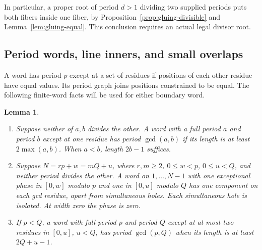 \documentclass[11pt,a4paper]{amsart}
\numberwithin{equation}{section}
\theoremstyle{plain}
\newtheorem{lemma}[theorem]{Lemma}
\theoremstyle{definition}
\begin{document}
In particular, a proper root of period \(d>1\) dividing two supplied periods puts both fibers inside one fiber, by Proposition~\ref{prop:gluing-divisible} and Lemma~\ref{lem:gluing-equal}.  This conclusion requires an actual legal divisor root.

\subsection{Period words, line inners, and small overlaps}

A word has period \(p\) except at a set of residues if positions of each other residue have equal values.  Its period graph joins positions constrained to be equal.  The following finite-word facts will be used for either boundary word.

\begin{lemma}\label{lem:gluing-periods}
\begin{enumerate}
\item[(i)] Suppose neither of \(a,b\) divides the other.  A word with a full period \(a\) and period \(b\) except at one residue has period \(\gcd(a,b)\) if its length is at least \(2\max(a,b)\).  When \(a<b\), length \(2b-1\) suffices.
\item[(ii)] Suppose \(N=rp+w=mQ+u\), where \(r,m\ge2\), \(0\le w<p\), \(0\le u<Q\), and neither period divides the other.  A word on \(1,\ldots,N-1\) with one exceptional phase in \([0,w]\) modulo \(p\) and one in \([0,u]\) modulo \(Q\) has one component on each gcd residue, apart from simultaneous holes.  Each simultaneous hole is isolated.  At width zero the phase is zero.
\item[(iii)] If \(p<Q\), a word with full period \(p\) and period \(Q\) except at at most two residues in \([0,u]\), \(u<Q\), has period \(\gcd(p,Q)\) when its length is at least \(2Q+u-1\).
\end{enumerate}
\end{lemma}
\end{document}
